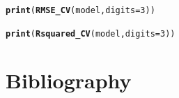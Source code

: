 \documentclass[twoside,a4wide,12pt]{article}\usepackage[]{graphicx}\usepackage[]{color}
\makeatletter
\newcommand{\hlnum}[1]{\textcolor[rgb]{0.686,0.059,0.569}{#1}}%
\newcommand{\hlstd}[1]{\textcolor[rgb]{0.345,0.345,0.345}{#1}}%
\newcommand{\hlkwc}[1]{\textcolor[rgb]{0.333,0.667,0.333}{#1}}%
\newcommand{\hlkwd}[1]{\textcolor[rgb]{0.737,0.353,0.396}{\textbf{#1}}}%
\newenvironment{kframe}{%
 \def\at@end@of@kframe{}%
 \ifinner\ifhmode%
  \def\at@end@of@kframe{\end{minipage}}%
  \begin{minipage}{\columnwidth}%
 \fi\fi%
 \def\FrameCommand##1{\hskip\@totalleftmargin \hskip-\fboxsep
 \colorbox{shadecolor}{##1}\hskip-\fboxsep
     \hskip-\linewidth \hskip-\@totalleftmargin \hskip\columnwidth}%
 \MakeFramed {\advance\hsize-\width
   \@totalleftmargin\z@ \linewidth\hsize
   \@setminipage}}%
 {\par\unskip\endMakeFramed%
 \at@end@of@kframe}
\newenvironment{knitrout}{}{} %
\makeatother
\begin{document}
\begin{knitrout}
\color{fgcolor}\begin{kframe}
\begin{alltt}
\hlkwd{print}\hlstd{(}\hlkwd{RMSE_CV}\hlstd{(model,} \hlkwc{digits} \hlstd{=} \hlnum{3}\hlstd{))}
\end{alltt}


{\ttfamily\noindent\bfseries{}}\begin{alltt}
\hlkwd{print}\hlstd{(}\hlkwd{Rsquared_CV}\hlstd{(model,} \hlkwc{digits} \hlstd{=} \hlnum{3}\hlstd{))}
\end{alltt}


{\ttfamily\noindent\bfseries{}}\end{kframe}
\end{knitrout}

\section{Bibliography}
\printbibliography
\end{document}
